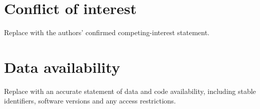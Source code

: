 \documentclass[unnumsec,webpdf,contemporary,large,namedate]{oup-authoring-template}
\begin{document}
\section*{Conflict of interest}
Replace with the authors' confirmed competing-interest statement.

\section*{Data availability}
Replace with an accurate statement of data and code availability, including
stable identifiers, software versions and any access restrictions.



\end{document}
